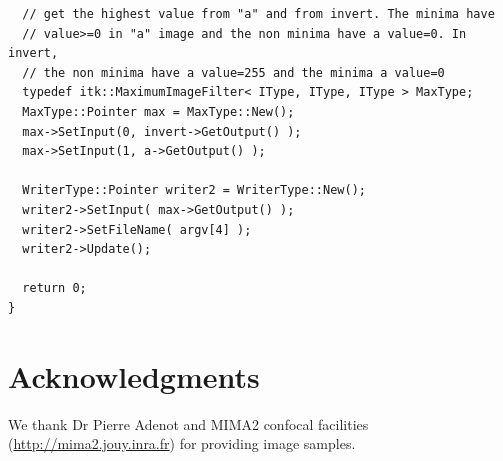 \documentclass{InsightArticle}
\begin{document}
\begin{verbatim}
  // get the highest value from "a" and from invert. The minima have
  // value>=0 in "a" image and the non minima have a value=0. In invert,
  // the non minima have a value=255 and the minima a value=0
  typedef itk::MaximumImageFilter< IType, IType, IType > MaxType;
  MaxType::Pointer max = MaxType::New();
  max->SetInput(0, invert->GetOutput() );
  max->SetInput(1, a->GetOutput() );

  WriterType::Pointer writer2 = WriterType::New();
  writer2->SetInput( max->GetOutput() );
  writer2->SetFileName( argv[4] );
  writer2->Update();

  return 0;
}
\end{verbatim} \normalsize

\section{Acknowledgments}
We thank Dr Pierre Adenot and MIMA2 confocal facilities (\url{http://mima2.jouy.inra.fr})
for providing image samples.




\nocite{ITKSoftwareGuide}
\nocite{Vincent93}
\nocite{Soille2003}
\end{document}
